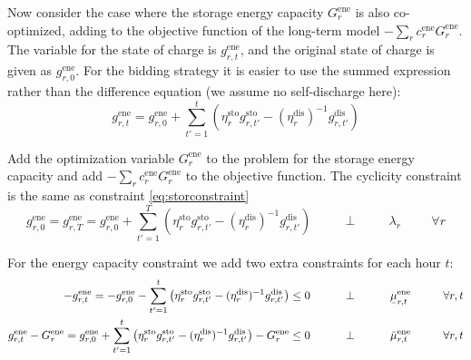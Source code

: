 \documentclass[final,3p,times]{elsarticle}
\begin{document}
Now consider the case where the storage energy capacity $G^{\textrm{ene}}_r$ is
also co-optimized, adding to the objective function of the long-term model
$-\sum_r c^{\textrm{ene}}_r G^{\textrm{ene}}_r$. The variable for the state of
charge is $g^{\textrm{ene}}_{r,t}$, and the original state of charge is given as
$g^{\textrm{ene}}_{r,0}$. For the bidding strategy it is easier to use the
summed expression rather than the difference equation (we assume no
self-discharge here):
\begin{equation}
  g^{\textrm{ene}}_{r,t} = g^{\textrm{ene}}_{r,0} + \sum_{t'=1}^t \left( \eta^{\textrm{sto}}_r g^{\textrm{sto}}_{r,t'} - (\eta^{\textrm{dis}}_r)^{-1} g^{\textrm{dis}}_{r,t'} \right)
\end{equation}

Add the optimization variable $G^{\textrm{ene}}_r$ to the problem for the
storage energy capacity and add $-\sum_r c^{\textrm{ene}}_r G^{\textrm{ene}}_r$
to the objective function. The cyclicity constraint is the same as constraint
\eqref{eq:storconstraint}
\begin{equation}
  g^{\textrm{ene}}_{r,0} = g^{\textrm{ene}}_{r,T} = g^{\textrm{ene}}_{r,0} + \sum_{t'=1}^T \left( \eta^{\textrm{sto}}_r g^{\textrm{sto}}_{r,t'} - (\eta^{\textrm{dis}}_r)^{-1} g^{\textrm{dis}}_{r,t'} \right)   \hspace{1cm}\perp \hspace{1cm} \lambda_{r} \hspace{1cm} \forall r
\end{equation}

For the energy capacity constraint  we add two extra constraints for each hour
$t$:
\begin{align}
  -g^{\textrm{ene}}_{r,t} =   -g^{\textrm{ene}}_{r,0} - \sum_{t'=1}^t \left( \eta^{\textrm{sto}}_r g^{\textrm{sto}}_{r,t'} - (\eta^{\textrm{dis}}_r)^{-1} g^{\textrm{dis}}_{r,t'} \right) \leq  0  \hspace{1cm}\perp \hspace{1cm} \ubar{\mu}^{\textrm{ene}}_{r,t} \hspace{1cm} \forall r,t \label{eq:enelower} \\
  g^{\textrm{ene}}_{r,t} - G^{\textrm{ene}}_r = g^{\textrm{ene}}_{r,0} + \sum_{t'=1}^t \left( \eta^{\textrm{sto}}_r g^{\textrm{sto}}_{r,t'} - (\eta^{\textrm{dis}}_r)^{-1} g^{\textrm{dis}}_{r,t'} \right) - G^{\textrm{ene}}_r \leq  0  \hspace{1cm}\perp \hspace{1cm} \bar{\mu}^{\textrm{ene}}_{r,t} \hspace{1cm} \forall r,t \label{eq:eneupper}
\end{align}
\end{document}
